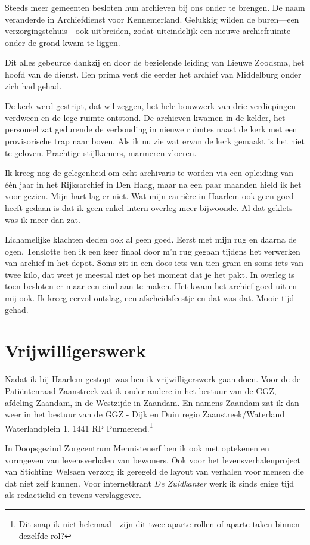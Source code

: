 \documentclass[10pt,twoside,openright]{memoir}
\begin{document}
Steeds meer gemeenten besloten hun archieven bij ons onder te brengen. De naam veranderde in Archiefdienst voor Kennemerland. Gelukkig wilden de buren---een verzorgingstehuis---ook uitbreiden, zodat uiteindelijk een nieuwe archiefruimte onder de grond kwam te liggen. 

Dit alles gebeurde dankzij en door de bezielende leiding van Lieuwe Zoodsma, het hoofd van de dienst. Een prima vent die eerder het archief van Middelburg onder zich had gehad.

De kerk werd gestript, dat wil zeggen, het hele bouwwerk van drie verdiepingen verdween en de lege ruimte ontstond. De archieven kwamen in de kelder, het personeel zat gedurende de verbouding in nieuwe ruimtes naast de kerk met een provisorische trap naar boven. Als ik nu zie wat ervan de kerk gemaakt is het niet te geloven. Prachtige stijlkamers, marmeren vloeren.

Ik kreeg nog de gelegenheid om echt archivaris te worden via een opleiding van één jaar in het Rijksarchief in Den Haag, maar na een paar maanden hield ik het voor gezien. Mijn hart lag er niet. Wat mijn carrière in Haarlem ook geen goed heeft gedaan is dat ik geen enkel intern overleg meer bijwoonde. Al dat geklets was ik meer dan zat. 

Lichamelijke klachten deden ook al geen goed. Eerst met mijn rug en daarna de ogen. Tenslotte ben ik een keer finaal door m’n rug gegaan tijdens het verwerken van archief in het depot. Soms zit in een doos iets van tien gram en soms iets van twee kilo, dat weet je meestal niet op het moment dat je het pakt. In overleg is toen besloten er maar een eind aan te maken. Het kwam het archief goed uit en mij ook. Ik kreeg eervol ontslag, een afscheidsfeestje en dat was dat. Mooie tijd gehad.

\chapter{Vrijwilligerswerk} %
\label{cha:vrijwilligerswerk}

Nadat ik bij Haarlem gestopt was ben ik vrijwilligerswerk gaan doen. Voor de de Patiëntenraad Zaanstreek zat ik onder andere in het bestuur van de GGZ, afdeling Zaandam, in de Westzijde in Zaandam. En namens Zaandam zat ik dan weer in het bestuur van de GGZ - Dijk en Duin regio Zaanstreek/Waterland Waterlandplein 1, 1441 RP Purmerend.\footnote{Dit snap ik niet helemaal - zijn dit twee aparte rollen of aparte taken binnen dezelfde rol?} 

In Doopsgezind Zorgcentrum Mennistenerf ben ik ook met optekenen en vormgeven van levensverhalen van bewoners. Ook voor het levensverhalenproject van Stichting Welsaen verzorg ik geregeld de layout van verhalen voor mensen die dat niet zelf kunnen. Voor internetkrant \emph{De Zuidkanter} werk ik sinds enige tijd als redactielid en tevens verslaggever.
\end{document}
